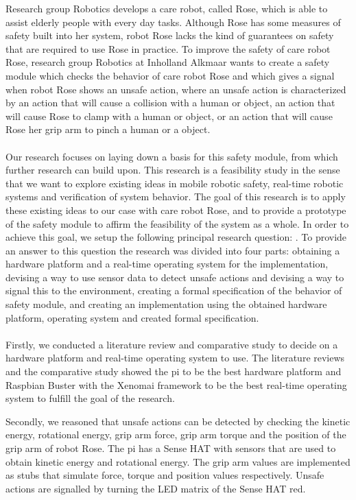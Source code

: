 \documentclass[12pt]{scrreprt}
\begin{document}
Research group Robotics develops a care robot, called Rose, which is able to assist elderly people with every day tasks. Although Rose has some measures of safety built into her system, robot Rose lacks the kind of guarantees on safety that are required to use Rose in practice. To improve the safety of care robot Rose, research group Robotics at Inholland Alkmaar wants to create a safety module which checks the behavior of care robot Rose and which gives a signal when robot Rose shows an unsafe action, where an unsafe action is characterized by an action that will cause a collision with a human or object, an action that will cause Rose to clamp with a human or object, or an action that will cause Rose her grip arm to pinch a human or a object.
\\\\
Our research focuses on laying down a basis for this safety module, from which further research can build upon. This research is a feasibility study in the sense that we want to explore existing ideas in mobile robotic safety, real-time robotic systems and verification of system behavior. The goal of this research is to apply these existing ideas to our case with care robot Rose, and to provide a prototype of the safety module to affirm the feasibility of the system as a whole. In order to achieve this goal, we setup the following principal research question: \textit{\mq}. To provide an answer to this question the research was divided into four parts: obtaining a hardware platform and a real-time operating system for the implementation, devising a way to use sensor data to detect unsafe actions and devising a way to signal this to the environment, creating a formal specification of the behavior of safety module, and creating an implementation using the obtained hardware platform, operating system and created formal specification.
\\\\
Firstly, we conducted a literature review and comparative study to decide on a hardware platform and real-time operating system to use. The literature reviews and the comparative study showed the \gls{pi} to be the best hardware platform and Raspbian Buster with the Xenomai framework to be the best real-time operating system to fulfill the goal of the research.
\par
Secondly, we reasoned that unsafe actions can be detected by checking the kinetic energy, rotational energy, grip arm force, grip arm torque and the position of the grip arm of robot Rose. The \gls{pi} has a Sense HAT with sensors that are used to obtain kinetic energy and rotational energy. The grip arm values are implemented as stubs that simulate force, torque and position values respectively. Unsafe actions are signalled by turning the LED matrix of the Sense HAT red.
\end{document}
